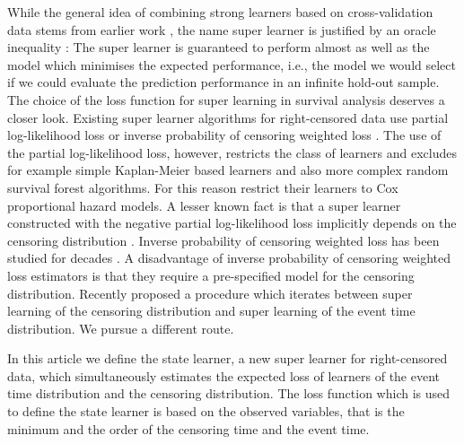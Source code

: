 \documentclass{statsoc}
\newcommand{\1}{\mathds{1}}
\begin{document}
While the general idea of combining strong learners based on
cross-validation data stems from earlier work
\citep{wolpert1992stacked,breiman1996stacked}, the name super learner
is justified by an oracle inequality
\citep{van2003unicv,vaart2006oracle}: The super learner is guaranteed
to perform almost as well as the model which minimises the expected
performance, i.e., the model we would select if we could evaluate the
prediction performance in an infinite hold-out sample. The choice of
the loss function for super learning in survival analysis deserves a
closer look. Existing super learner algorithms for right-censored data
use partial log-likelihood loss or inverse probability of censoring
weighted loss
\citep{polley2011-sl-cens,keles2004asymptotically,golmakani2020super,westling2021inference}.
The use of the partial log-likelihood loss, however, restricts the
class of learners and excludes for example simple Kaplan-Meier based
learners and also more complex random survival forest algorithms. For
this reason \cite{golmakani2020super} restrict their learners to Cox
proportional hazard models. A lesser known fact is that a super
learner constructed with the negative partial log-likelihood loss
implicitly depends on the censoring distribution
\citep{hjort1992inference,whitney2019comment}. Inverse probability of
censoring weighted loss has been studied for decades
\citep{graf1999assessment, hothorn2006survival,
  gerds2006consistent}. A disadvantage of inverse probability of
censoring weighted loss estimators is that they require a
pre-specified model for the censoring distribution. Recently
\cite{westling2021inference} proposed a procedure which iterates
between super learning of the censoring distribution and super
learning of the event time distribution. We pursue a
different route.

In this article we define the state learner, a new super learner for
right-censored data, which simultaneously estimates the expected loss
of learners of the event time distribution and the censoring
distribution. The loss function which is used to define the state
learner is based on the observed variables, that is the minimum and
the order of the censoring time and the event
time.
\end{document}
